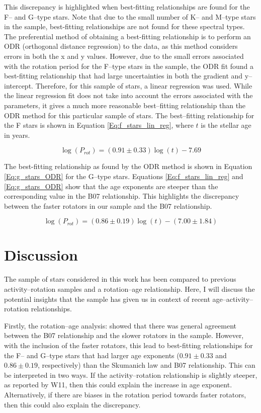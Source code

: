This discrepancy is highlighted when best-fitting relationships are found for the F-- and G--type stars. Note that due to the small number of K-- and M--type stars in the sample, best-fitting relationships are not found for these spectral types. The preferential method of obtaining a best-fitting relationship is to perform an ODR (orthogonal distance regression) to the data, as this method considers errors in both the x and y values. However, due to the small errors associated with the rotation period for the F--type stars in the sample, the ODR fit found a best-fitting relationship that had large uncertainties in both the gradient and y--intercept. Therefore, for this sample of stars, a linear regression was used. While the linear regression fit does not take into account the errors associated with the parameters, it gives a much more reasonable best--fitting relationship than the ODR method for this particular sample of stars. The best--fitting relationship for the F stars is shown in Equation \ref{Eq:f_stars_lin_reg}, where $t$ is the stellar age in years.

\begin{equation}
    \log(P_{rot}) = (0.91 \pm 0.33)\log(t) -7.69
    \label{Eq:f_stars_lin_reg}
\end{equation}

The best-fitting relationship as found by the ODR method is shown in Equation \ref{Eq:g_stars_ODR} for the G--type stars. Equations \ref{Eq:f_stars_lin_reg} and \ref{Eq:g_stars_ODR} show that the age exponents are steeper than the corresponding value in the B07 relationship. This highlights the discrepancy between the faster rotators in our sample and the B07 relationship.

\begin{equation}
    \log(P_{rot}) = (0.86 \pm 0.19)\log(t) - (7.00 \pm 1.84)
    \label{Eq:g_stars_ODR}
\end{equation}

\section{Discussion}
\label{Chp5_discussion}

The sample of stars considered in this work has been compared to previous activity--rotation samples and a rotation--age relationship. Here, I will discuss the potential insights that the sample has given us in context of recent age--activity--rotation relationships.

Firstly, the rotation--age analysis: showed that there was general agreement between the B07 relationship and the slower rotators in the sample. However, with the inclusion of the faster rotators, this lead to best-fitting relationships for the F-- and G--type stars that had larger age exponents ($0.91 \pm 0.33$ and $0.86 \pm 0.19$, respectively) than the Skumanich law and B07 relationship. This can be interpreted in two ways. If the activity--rotation relationship is slightly steeper, as reported by W11, then this could explain the increase in age exponent. Alternatively, if there are biases in the rotation period towards faster rotators, then this could also explain the discrepancy.

